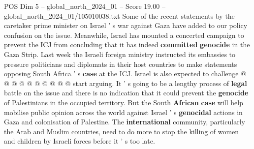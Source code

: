 \begin{textsample}{POS Dim 5 – global\_north\_2024\_01 – Score 19.00 – global\_north\_2024\_01/105010038.txt}
Some of the recent statements by the caretaker prime minister on Israel ' s war against Gaza have added to our policy confusion on the issue.
Meanwhile, Israel has mounted a concerted campaign to prevent the ICJ from concluding that it has indeed \textbf{committed} \textbf{genocide} in the Gaza Strip.
Last week the Israeli foreign ministry instructed its embassies to pressure politicians and diplomats in their host countries to make statements opposing South Africa ' s \textbf{case} at the ICJ.
Israel is also expected to challenge @ @ @ @ @ @ @ @ @ @ start arguing.
It ' s going to be a lengthy process of \textbf{legal} battle on the issue and there is no indication that it could prevent the \textbf{genocide} of Palestinians in the occupied territory.
But the South \textbf{African} \textbf{case} will help mobilise public opinion across the world against Israel ' s \textbf{genocidal} actions in Gaza and colonisation of Palestine.
The \textbf{international} community, particularly the Arab and Muslim countries, need to do more to stop the killing of women and children by Israeli forces before it ' s too late.

\end{textsample}
